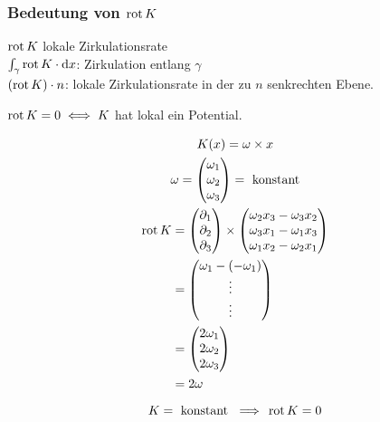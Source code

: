 \subsubsection{Bedeutung von \texorpdfstring{$\operatorname{rot} K$}{rot K}}
$\operatorname{rot} K$ lokale Zirkulationsrate \\
$\int_{\gamma} \operatorname{rot} K \cdot \dd x$: Zirkulation entlang $\gamma$ \\
$(\operatorname{rot} K) \cdot n$: lokale Zirkulationsrate in der zu $n$ senkrechten Ebene.
\begin{bem}
	$\operatorname{rot} K = 0 \iff K$ hat lokal ein Potential.
\end{bem}
\begin{bsp*}
	\begin{gather*}
		K(x) = \omega \times x \\
		\omega = \begin{pmatrix} \omega_1 \\ \omega_2 \\ \omega_3 \end{pmatrix} = \text{ konstant} \\
		\begin{split}
			\operatorname{rot} K
				&= \begin{pmatrix} \partial_1 \\ \partial_2 \\ \partial_3 \end{pmatrix} \times \begin{pmatrix} \omega_2 x_3 - \omega_3 x_2 \\ \omega_3 x_1 - \omega_1 x_3 \\ \omega_1 x_2 - \omega_2 x_1 \end{pmatrix} \\
				&= \begin{pmatrix} \omega_1 - (-\omega_1) \\ \vdots \\ \vdots \end{pmatrix} \\
				&= \begin{pmatrix} 2\omega_1 \\ 2\omega_2 \\ 2\omega_3 \end{pmatrix} \\
				&= 2\omega
		\end{split}
	\end{gather*}
\end{bsp*}
\begin{bsp*}
	\[ K = \text{ konstant } \implies \rot K = 0 \]
\end{bsp*}
